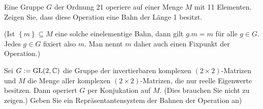 \begin{Problem}
	\begin{parts}
		\item Eine Gruppe $G$ der Ordnung 21 operiere auf einer Menge $M$ mit 11 Elementen. Zeigen Sie, dass diese Operation eine Bahn der Länge 1 besitzt.

			{\footnotesize (Ist $\left\{ m \right\} \subseteq M$ eine solche einelementige Bahn, dann gilt $g.m=m$ f\"{u}r alle $g\in G$. Jedes $g\in G$ fixiert also $m$. Man nennt $m$ daher auch einen Fixpunkt der Operation.)} 
		\item Sei $G:=\text{GL}(2,\mathbb{C})$ die Gruppe der invertierbaren komplexen $(2\times 2)$-Matrizen und $M$ die Menge aller komplexen $(2\times 2)$-Matrizen, die nur reelle Eigenwerte besitzen. Dann operiert $G$ per Konjukation auf $M$. (Dies brauchen Sie nicht zu zeigen.) Geben Sie ein Repräsentantensystem der Bahnen der Operation an)
		\end{parts}
\end{Problem}
